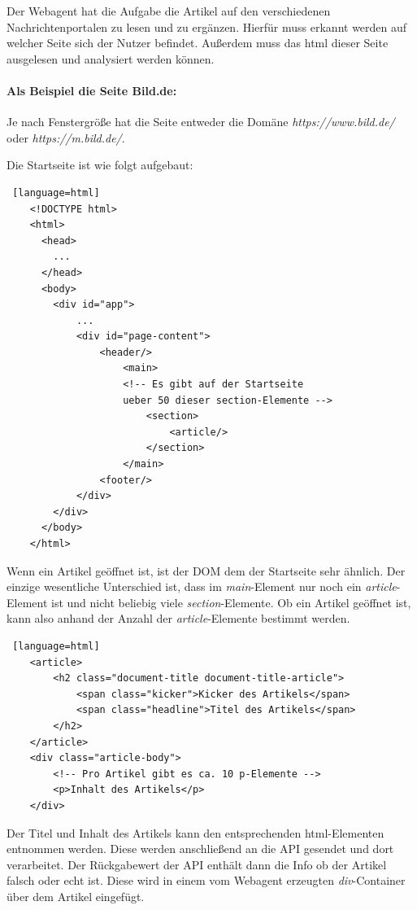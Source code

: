Der Webagent hat die Aufgabe die Artikel auf den verschiedenen Nachrichtenportalen zu lesen und zu ergänzen.
Hierfür muss erkannt werden auf welcher Seite sich der Nutzer befindet. Außerdem muss das html dieser Seite ausgelesen und analysiert werden können.

\paragraph{Als Beispiel die Seite Bild.de:} 
Je nach Fenstergröße hat die Seite entweder die Domäne \textit{https://www.bild.de/} oder \textit{https://m.bild.de/}.

Die Startseite ist wie folgt aufgebaut:

\begin{lstlisting} [language=html]
    <!DOCTYPE html>
    <html>
      <head>
        ...
      </head>
      <body>
        <div id="app">
            ...
            <div id="page-content">
                <header/>
                    <main>
                    <!-- Es gibt auf der Startseite 
                    ueber 50 dieser section-Elemente -->
                        <section>
                            <article/>
                        </section>
                    </main>
                <footer/>
            </div>    
        </div>
      </body>
    </html>
\end{lstlisting}

Wenn ein Artikel geöffnet ist, ist der DOM dem der Startseite sehr ähnlich. Der einzige wesentliche Unterschied ist, dass im \textit{main}-Element
nur noch ein \textit{article}-Element ist und nicht beliebig viele \textit{section}-Elemente.
Ob ein Artikel geöffnet ist, kann also anhand der Anzahl der \textit{article}-Elemente bestimmt werden.

\begin{lstlisting} [language=html]
    <article>
        <h2 class="document-title document-title-article">
            <span class="kicker">Kicker des Artikels</span>
            <span class="headline">Titel des Artikels</span>
        </h2>
    </article>
    <div class="article-body">
        <!-- Pro Artikel gibt es ca. 10 p-Elemente -->
        <p>Inhalt des Artikels</p>
    </div>
\end{lstlisting}

Der Titel und Inhalt des Artikels kann den entsprechenden html-Elementen entnommen werden.
Diese werden anschließend an die API gesendet und dort verarbeitet. 
Der Rückgabewert der API enthält dann die Info ob der Artikel falsch oder echt ist.
Diese wird in einem vom Webagent erzeugten \textit{div}-Container über dem Artikel eingefügt.
    
    
    